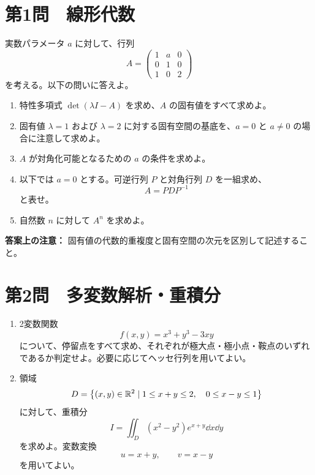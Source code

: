 \section*{第1問　線形代数 }
実数パラメータ $a$ に対して、行列
\[
A=\begin{pmatrix}
1 & a & 0\\
0 & 1 & 0\\
1 & 0 & 2
\end{pmatrix}
\]
を考える。以下の問いに答えよ。

\begin{enumerate}
  \item 特性多項式 $\det(\lambda I-A)$ を求め、$A$ の固有値をすべて求めよ。
  \item 固有値 $\lambda=1$ および $\lambda=2$ に対する固有空間の基底を、$a=0$ と $a\neq 0$ の場合に注意して求めよ。
  \item $A$ が対角化可能となるための $a$ の条件を求めよ。
  \item 以下では $a=0$ とする。可逆行列 $P$ と対角行列 $D$ を一組求め、
  \[
  A=PDP^{-1}
  \]
  と表せ。
  \item 自然数 $n$ に対して $A^n$ を求めよ。
\end{enumerate}

\vfill
\begin{pointbox}
\textbf{答案上の注意：} 固有値の代数的重複度と固有空間の次元を区別して記述すること。
\end{pointbox}
\newpage

\section*{第2問　多変数解析・重積分 }
\begin{enumerate}
  \item 2変数関数
  \[
  f(x,y)=x^3+y^3-3xy
  \]
  について、停留点をすべて求め、それぞれが極大点・極小点・鞍点のいずれであるか判定せよ。必要に応じてヘッセ行列を用いてよい。

  \item 領域
  \[
  D=\left\{(x,y)\in\mathbb{R}^2\mid 1\le x+y\le 2,\quad 0\le x-y\le 1\right\}
  \]
  に対して、重積分
  \[
  I=\iint_D (x^2-y^2)e^{x+y}\dd x\dd y
  \]
  を求めよ。変数変換
  \[
  u=x+y,\qquad v=x-y
  \]
  を用いてよい。
\end{enumerate}

\vspace{6mm}
\begin{center}
\end{center}
\newpage


